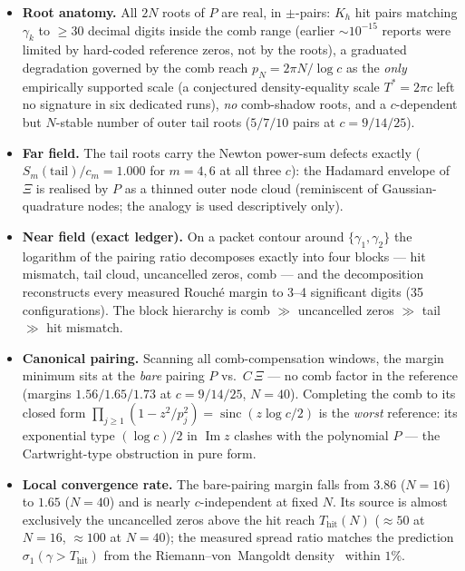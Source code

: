 \documentclass[12pt,a4paper]{article}
\theoremstyle{definition}
\theoremstyle{remark}
\begin{document}
\begin{itemize}
  \item \textbf{Root anatomy.} All $2N$ roots of $P$ are real, in
    $\pm$-pairs: $K_h$ hit pairs matching $\gamma_k$ to $\ge 30$ decimal
    digits inside the comb range (earlier $\sim\!10^{-15}$ reports were
    limited by hard-coded reference zeros, not by the roots), a
    graduated degradation governed by the comb reach
    $p_N = 2\pi N/\log c$ as the \emph{only} empirically supported scale
    (a conjectured density-equality scale $T^* = 2\pi c$ left no
    signature in six dedicated runs), \emph{no} comb-shadow roots, and a
    $c$-dependent but $N$-stable number of outer tail roots
    ($5/7/10$ pairs at $c=9/14/25$).
  \item \textbf{Far field.} The tail roots carry the Newton power-sum
    defects exactly ($S_m(\text{tail})/c_m = 1.000$ for $m=4,6$ at all
    three $c$): the Hadamard envelope of $\Xi$ is realised by $P$ as a
    thinned outer node cloud (reminiscent of Gaussian-quadrature nodes;
    the analogy is used descriptively only).
  \item \textbf{Near field (exact ledger).} On a packet contour around
    $\{\gamma_1,\gamma_2\}$ the logarithm of the pairing ratio
    decomposes exactly into four blocks --- hit mismatch, tail cloud,
    uncancelled zeros, comb --- and the decomposition reconstructs every
    measured Rouch\'e margin to 3--4 significant digits
    (35 configurations). The block hierarchy is
    comb $\gg$ uncancelled zeros $\gg$ tail $\gg$ hit mismatch.
  \item \textbf{Canonical pairing.} Scanning all comb-compensation
    windows, the margin minimum sits at the \emph{bare} pairing $P$
    vs.\ $C\,\Xi$ --- no comb factor in the reference (margins
    $1.56/1.65/1.73$ at $c=9/14/25$, $N=40$). Completing the comb to its
    closed form $\prod_{j\ge 1}(1-z^2/p_j^2) = \operatorname{sinc}(z\log
    c/2)$ is the \emph{worst} reference: its exponential type
    $(\log c)/2$ in $\operatorname{Im} z$ clashes with the polynomial
    $P$ --- the Cartwright-type obstruction in pure form.
  \item \textbf{Local convergence rate.} The bare-pairing margin falls
    from $3.86$ ($N=16$) to $1.65$ ($N=40$) and is nearly
    $c$-independent at fixed $N$. Its source is almost exclusively the
    uncancelled zeros above the hit reach $T_{\mathrm{hit}}(N)$
    ($\approx 50$ at $N=16$, $\approx 100$ at $N=40$); the measured
    spread ratio matches the prediction
    $\sigma_1(\gamma > T_{\mathrm{hit}})$ from the Riemann--von~Mangoldt
    density~\cite{Titchmarsh1986} within $1\%$.
\end{itemize}
\end{document}
